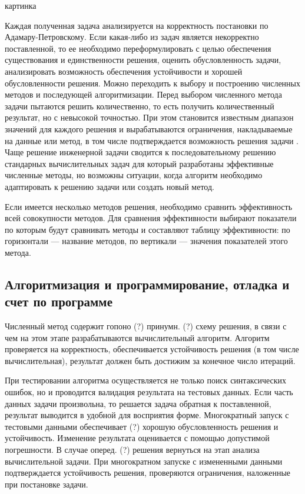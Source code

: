 \documentclass[12pt]{article}
\begin{document}
\begin{center}
    картинка
\end{center}

Каждая полученная задача анализируется на корректность постановки по Адамару-Петровскому. Если какая-либо из задач является некорректно поставленной, то ее необходимо переформулировать с целью обеспечения существования и единственности решения, оценить обусловленность задачи, анализировать возможность обеспечения устойчивости и хорошей обусловленности решения. Можно переходить к выбору и построению численных методов и последующей алгоритмизации. Перед выбором численного метода задачи пытаются решить количественно, то есть получить количественный результат, но с невысокой точностью. При этом становится известным диапазон значений для каждого решения и вырабатываются ограничения, накладываемые на данные или метод, в том числе подтверждается возможность решения задачи . Чаще решение инженерной задачи сводится к последовательному решению стандарных вычислительных задач для который разработаны эффективные численные методы, но возможны ситуации, когда алгоритм необходимо адаптировать к решению задачи или создать новый метод.

Если имеется несколько методов решения, необходимо сравнить эффективность всей совокупности методов. Для сравнения эффективности выбирают показатели по которым будут сравнивать методы и составляют таблицу эффективности: по горизонтали --- название методов, по вертикали --- значения показателей этого метода.

\subsection{Алгоритмизация и программирование, отладка и счет по программе}

Численный метод содержит гопоно (?) принумн. (?) схему решения, в связи с чем на этом этапе разрабатываются вычислительный алгоритм. Алгоритм проверяется на корректность, обеспечивается устойчивость решения (в том числе вычислительная), результат должен быть достижим за конечное число итераций.

При тестировании алгоритма осуществляется не только поиск синтаксических ошибок, но и проводится валидация результата на тестовых данных. Если часть данных задачи произвольна, то решается задача обратная к поставленной, результат выводится в удобной для восприятия форме. Многократный запуск с тестовыми данными обеспечивает (?) хорошую обусловленность решения и устойчивость. Изменение результата оценивается с помощью допустимой погрешности. В случае оперед. (?) решения вернуться на этап анализа вычислительной задачи. При многократном запуске с измененными данными подтверждается устойчивость решения, проверяются ограничения, наложенные при постановке задачи.
\end{document}
